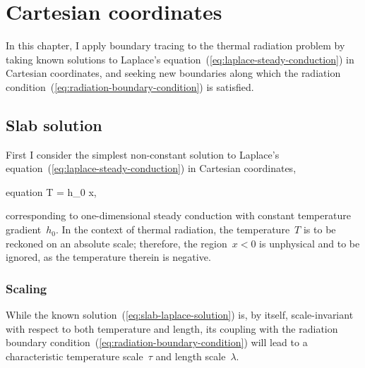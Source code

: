 \chapter{Cartesian coordinates}
\label{ch:cartesian}

In this chapter,
I apply boundary tracing to the thermal radiation problem
by taking known solutions
to Laplace's equation~(\ref{eq:laplace-steady-conduction})
in Cartesian coordinates,
and seeking new boundaries along which
the radiation condition~(\ref{eq:radiation-boundary-condition})
is satisfied.

\section{Slab solution}
\label{sec:cartesian.slab}

First I consider the simplest non-constant solution
to Laplace's equation~(\ref{eq:laplace-steady-conduction})
in Cartesian coordinates,
\begin{important}{equation}
  T = h_0 x,
  \label{eq:slab-laplace-solution}
\end{important}
corresponding to one-dimensional steady conduction
with constant temperature gradient~$h_0$.
In the context of thermal radiation,
the temperature~$T$ is to be reckoned on an absolute scale;
therefore, the region~$x < 0$ is unphysical and to be ignored,
as the temperature therein is negative.

\subsection{Scaling}
\label{sec:cartesian.slab.scaling}

While the known solution~(\ref{eq:slab-laplace-solution}) is, by itself,
scale-invariant with respect to both temperature and length,
its coupling with
the radiation boundary condition~(\ref{eq:radiation-boundary-condition})
will lead to a characteristic temperature scale~$\tau$
and length scale~$\lambda$.

